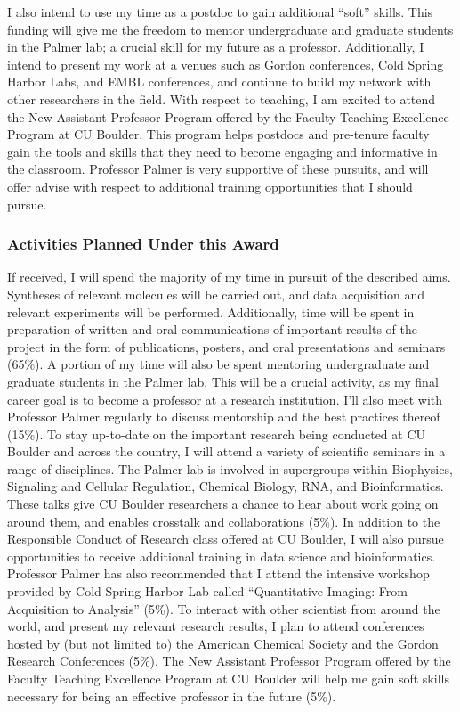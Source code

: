 \documentclass[11pt]{article}
\begin{document}

I also intend to use my time as a postdoc to gain additional ``soft'' skills. This funding will give me the freedom to mentor undergraduate and graduate students in the Palmer lab; a crucial skill for my future as a professor. Additionally, I intend to present my work at a venues such as Gordon conferences, Cold Spring Harbor Labs, and EMBL conferences, and continue to build my network with other researchers in the field. With respect to teaching, I am excited to attend the New Assistant Professor Program offered by the Faculty Teaching Excellence Program at CU Boulder. This program helps postdocs and pre-tenure faculty gain the tools and skills that they need to become engaging and informative in the classroom. Professor Palmer is very supportive of these pursuits, and will offer advise with respect to additional training opportunities that I should pursue.

\subsubsection*{Activities Planned Under this Award}
If received, I will spend the majority of my time in pursuit of the described aims. Syntheses of relevant molecules will be carried out, and data acquisition and relevant experiments will be performed. Additionally, time will be spent in preparation of written and oral communications of important results of the project in the form of publications, posters, and oral presentations and seminars (65\%).
A portion of my time will also be spent mentoring undergraduate and graduate students in the Palmer lab. This will be a crucial activity, as my final career goal is to become a professor at a research institution. I'll also meet with Professor Palmer regularly to discuss mentorship and the best practices thereof (15\%).
To stay up-to-date on the important research being conducted at CU Boulder and across the country, I will attend a variety of scientific seminars in a range of disciplines. The Palmer lab is involved in supergroups within Biophysics, Signaling and Cellular Regulation, Chemical Biology, RNA, and Bioinformatics. These talks give CU Boulder researchers a chance to hear about work going on around them, and enables crosstalk and collaborations (5\%).
In addition to the Responsible Conduct of Research class offered at CU Boulder, I will also pursue opportunities to receive additional training in data science and bioinformatics. Professor Palmer has also recommended that I attend the intensive workshop provided by Cold Spring Harbor Lab called ``Quantitative Imaging: From Acquisition to Analysis'' (5\%).
To interact with other scientist from around the world, and present my relevant research results, I plan to attend conferences hosted by (but not limited to) the American Chemical Society and the Gordon Research Conferences (5\%).
The New Assistant Professor Program offered by the Faculty Teaching Excellence Program at CU Boulder will help me gain soft skills necessary for being an effective professor in the future (5\%).
\end{document}
